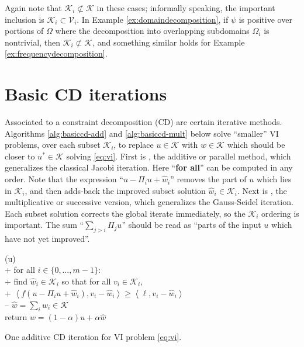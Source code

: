 \documentclass[letterpaper,final,12pt,reqno]{amsart}
\theoremstyle{cstyle}
\theoremstyle{cstyle*}
\theoremstyle{dstyle}
\numberwithin{equation}{section}
\numberwithin{figure}{section}
\numberwithin{table}{section}
\numberwithin{theorem}{section}
\newcommand{\cK}{\mathcal{K}}
\newcommand{\cV}{\mathcal{V}}
\newcommand{\ip}[2]{\left<#1,#2\right>}
\begin{document}
Again note that $\cK_i \not\subset \cK$ in these cases; informally speaking, the important inclusion is $\cK_i \subset \cV_i$.  In Example \ref{ex:domaindecomposition}, if $\psi$ is positive over portions of $\Omega$ where the decomposition into overlapping subdomains $\Omega_i$ is nontrivial, then $\cK_i \not\subset \cK$, and something similar holds for Example \ref{ex:frequencydecomposition}.


\section{Basic CD iterations} \label{sec:cditers}

Associated to a constraint decomposition (CD) are certain iterative methods.  Algorithms \ref{alg:basiccd-add} and \ref{alg:basiccd-mult} below solve ``smaller'' VI problems, over each subset $\cK_i$, to replace $u \in \cK$ with $w\in\cK$ which should be closer to $u^* \in \cK$ solving \eqref{eq:vi}.  First is , the additive or parallel method, which generalizes the classical Jacobi iteration.  Here ``\textbf{for all}'' can be computed in any order.  Note that the expression ``$u-\Pi_iu+\hat w_i$'' removes the part of $u$ which lies in $\mathcal{K}_i$, and then adds-back the improved subset solution $\hat w_i \in \mathcal{K}_i$.  Next is , the multiplicative or successive version, which generalizes the Gauss-Seidel iteration.  Each subset solution corrects the global iterate immediately, so the $\mathcal{K}_i$ ordering is important.  The sum ``$\sum_{j>i} \Pi_j u$'' should be read as ``parts of the input $u$ which have not yet improved''.


\begin{pseudofloat}[H]
\begin{pseudo*}
(u)\text{:} \\+
    for all $i \in \{0,\dots,m-1\}$: \\+
        \rm{find} $\hat w_i\in \cK_i$ \rm{so that for all} $v_i\in \cK_i$, \\+
            $\boxed{\ip{f(u - \Pi_i u + \hat w_i)}{v_i-\hat w_i} \ge \ip{\ell}{v_i-\hat w_i}}$ \\--
    $\hat w = \sum_i \hat w_i\in\cK$ \\
    return $w=(1-\alpha) u + \alpha \hat w$
\end{pseudo*}
\caption{One additive CD iteration for VI problem \eqref{eq:vi}.}
\label{alg:basiccd-add}
\end{pseudofloat}
\end{document}
